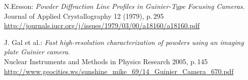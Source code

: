 \documentclass[a4paper, parskip=half, 12pt, bibliography=totocnumbered]{scrartcl}
\begin{document}





\begin{thebibliography}{10}
N.Ersson: \emph{Powder Diffraction Line Profiles in Guinier-Type Focusing Cameras}.\\
Journal of Applied Crystallography 12 (1979), p.\,295\\
\url{http://journals.iucr.org/j/issues/1979/03/00/a18160/a18160.pdf}

J. Gal et al.: \emph{Fast high-resolution characterization of powders using an imaging plate Guinier camera}.\\
Nuclear Instruments and Methods in Physics Research 2005, p.\,145\\
\url{http://www.geocities.ws/sunshine_mike_69/14_Guinier_Camera_670.pdf}

\end{thebibliography}
\end{document}

